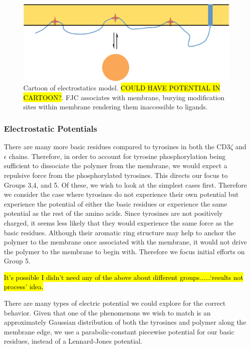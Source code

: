 \documentclass[../../AdvancementSummary.tex]{subfiles}
\begin{document}
\begin{figure}[H]
\begin{center}
    \includegraphics[width=0.7\linewidth]{ElectrostaticsDiagram.pdf}
    \caption{Cartoon of electrostatics model.  \hl{COULD HAVE POTENTIAL IN CARTOON?}. FJC associates with membrane, burying modification sites within membrane rendering them inaccessible to ligands.\label{fig: ElectrostaticsCartoon}}
    \end{center}
\end{figure}


\subsubsection{Electrostatic Potentials}

There are many more basic residues compared to tyrosines in both the CD3$\zeta$ and $\epsilon$ chains.  Therefore, in order to account for tyrosine phosphorylation being sufficient to dissociate the polymer from the membrane, we would expect a repulsive force from the phosphorylated tyrosines. This directs our focus to Groups 3,4, and 5. Of these, we wish to look at the simplest cases first.  Therefore we consider the case where tyrosines do not experience their own potential but experience the potential of either the basic residues or experience the same potential as the rest of the amino acids.  Since tyrosines are not positively charged, it seems less likely that they would experience the same force as the basic residues.  Although their aromatic ring structure may help to anchor the polymer to the membrane once associated with the membrane, it would not drive the polymer to the membrane to begin with. \cite{Lopez2015} Therefore we focus initial efforts on Group 5.

\hl{It's possible I didn't need any of the above about different groups......`results not process' idea.}

There are many types of electric potential we could explore for the correct behavior.  Given that one of the phenomenons we wish to match is an approximately Gaussian distribution of both the tyrosines and polymer along the membrane edge, we use a parabolic-constant piecewise potential for our basic residues, instead of a Lennard-Jones potential.
\end{document}
